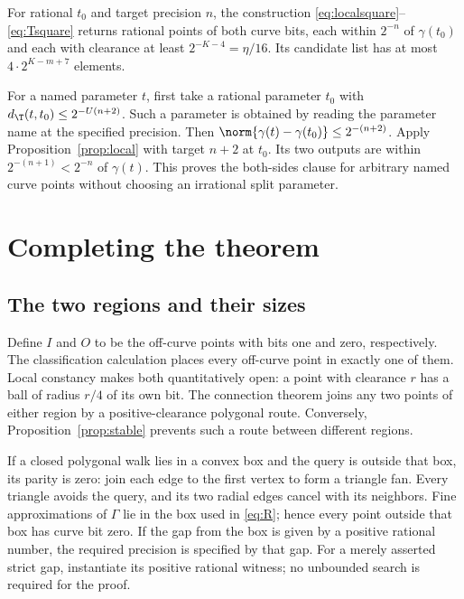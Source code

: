 \begin{proposition}\label{prop:local}
For rational $t_0$ and target precision $n$, the construction
\eqref{eq:localsquare}--\eqref{eq:Tsquare} returns rational
points of both curve bits, each within $2^{-n}$ of
$\gamma(t_0)$ and each with clearance at least
$2^{-K-4}=\eta/16$. Its candidate list has at most
$4\cdot2^{K-m+7}$ elements.
\end{proposition}

For a named parameter $t$, first take a rational parameter $t_0$
with $d_\T(t,t_0)\le2^{-U(n+2)}$. Such a parameter is obtained
by reading the parameter name at the specified precision.
Then $\norm{\gamma(t)-\gamma(t_0)}\le2^{-(n+2)}$.
Apply Proposition~\ref{prop:local} with target $n+2$ at
$t_0$. Its two outputs are within $2^{-(n+1)}<2^{-n}$ of
$\gamma(t)$. This proves the both-sides clause for arbitrary
named curve points without choosing an irrational split parameter.

\section{Completing the theorem}\label{sec:completion}

\subsection{The two regions and their sizes}

Define $I$ and $O$ to be the off-curve points with bits one and
zero, respectively. The classification calculation places every
off-curve point in exactly one of them. Local constancy makes
both quantitatively open: a point with clearance $r$ has a
ball of radius $r/4$ of its own bit. The connection theorem
joins any two points of either region by a positive-clearance
polygonal route. Conversely, Proposition~\ref{prop:stable}
prevents such a route between different regions.

If a closed polygonal walk lies in a convex box and the query is
outside that box, its parity is zero: join each edge to the first
vertex to form a triangle fan. Every triangle avoids the query,
and its two radial edges cancel with its neighbors.
Fine approximations of $\Gamma$ lie in the box used in
\eqref{eq:R}; hence every point outside that box has curve bit zero.
If the gap from the box is given by a positive rational number,
the required precision is specified by that gap.
For a merely asserted strict gap, instantiate its positive
rational witness; no unbounded search is required for the proof.

